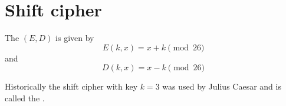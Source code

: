 \section{Shift cipher}

\begin{defn}
The  $(E, D)$ is given by
\[
  E(k, x) = x + k \pmod{26}
\]
and
\[
  D(k, x) = x - k \pmod{26}
\]
\end{defn}

Historically the shift cipher with key $k = 3$ was used by
Julius Caesar and is called the .
